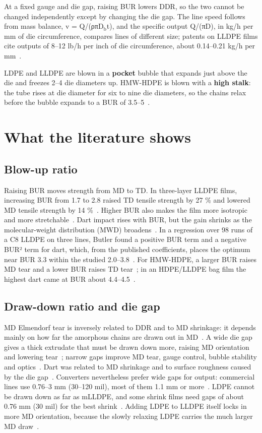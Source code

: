 \documentclass[conference,a4paper]{IEEEtran}
\begin{document}
At a fixed gauge and die gap, raising BUR lowers DDR, so the two cannot be changed independently except by changing the die gap. The line speed follows from mass balance, v = Q/(ρπD$_{\mathrm{b}}$t), and the specific output Q/(πD), in kg/h per mm of die circumference, compares lines of different size; patents on LLDPE films cite outputs of 8–12 lb/h per inch of die circumference, about 0.14–0.21 kg/h per mm~\cite{r14}.

LDPE and LLDPE are blown in a \textbf{pocket} bubble that expands just above the die and freezes 2–4 die diameters up. HMW-HDPE is blown with a \textbf{high stalk}: the tube rises at die diameter for six to nine die diameters, so the chains relax before the bubble expands to a BUR of 3.5–5~\cite{r8}.

\section{What the literature shows}

\subsection{Blow-up ratio}

Raising BUR moves strength from MD to TD. In three-layer LLDPE films, increasing BUR from 1.7 to 2.8 raised TD tensile strength by 27 \% and lowered MD tensile strength by 14 \%~\cite{r2}. Higher BUR also makes the film more isotropic and more stretchable~\cite{r18}. Dart impact rises with BUR, but the gain shrinks as the molecular-weight distribution (MWD) broadens~\cite{r3}. In a regression over 98 runs of a C8 LLDPE on three lines, Butler found a positive BUR term and a negative BUR² term for dart, which, from the published coefficients, places the optimum near BUR 3.3 within the studied 2.0–3.8~\cite{r4}. For HMW-HDPE, a larger BUR raises MD tear and a lower BUR raises TD tear~\cite{r8}; in an HDPE/LLDPE bag film the highest dart came at BUR about 4.4–4.5~\cite{r9}.

\subsection{Draw-down ratio and die gap}

MD Elmendorf tear is inversely related to DDR and to MD shrinkage: it depends mainly on how far the amorphous chains are drawn out in MD~\cite{r5}. A wide die gap gives a thick extrudate that must be drawn down more, raising MD orientation and lowering tear~\cite{r12}; narrow gaps improve MD tear, gauge control, bubble stability and optics~\cite{r11}. Dart was related to MD shrinkage and to surface roughness caused by the die gap~\cite{r5}. Converters nevertheless prefer wide gaps for output: commercial lines use 0.76–3 mm (30–120 mil), most of them 1.1 mm or more~\cite{r13}. LDPE cannot be drawn down as far as mLLDPE, and some shrink films need gaps of about 0.76 mm (30 mil) for the best shrink~\cite{r13}. Adding LDPE to LLDPE itself locks in more MD orientation, because the slowly relaxing LDPE carries the much larger MD draw~\cite{r17}.
\end{document}
